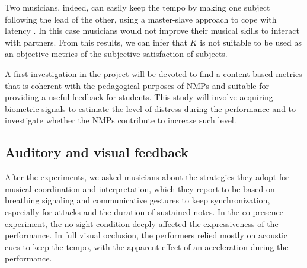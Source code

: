 Two musicians, indeed, can easily keep the tempo by making one subject following the lead of the other, using a master-slave approach to cope with latency \cite{Carot07networkmusic}. In this case musicians would not improve their musical skills to interact with partners. From this results, we can infer that $K$ is not suitable to be used as an objective metrics of the subjective satisfaction of subjects. 

A first investigation in the project will be devoted to find a content-based metrics that is coherent with the pedagogical purposes of NMPs and suitable for providing a 
useful feedback for students.%
This study will involve acquiring %
biometric signals to estimate the level of distress during the performance and to investigate whether the NMPs contribute to increase such level. 

\subsection{Auditory and visual feedback}
After the experiments, we asked musicians about the strategies they adopt for 
musical coordination and interpretation, which they report to be based on breathing signaling and communicative gestures to keep synchronization, especially for attacks and the duration of sustained notes. In the co-presence experiment, %
the no-sight condition deeply affected the expressiveness of the performance. In full visual occlusion, the performers relied mostly on acoustic cues to keep the tempo, with the apparent effect of an acceleration during the performance. 

